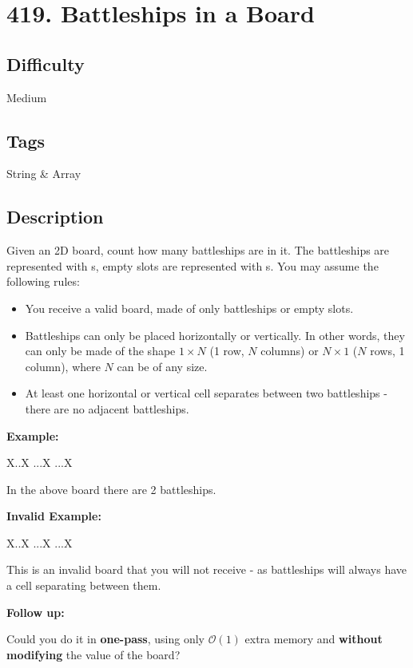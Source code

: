 \tocless\section{419. Battleships in a Board}
\label{algo:419}

\subsection*{Difficulty}
Medium

\subsection*{Tags}
String \& Array

\subsection*{Description}
Given an 2D board, count how many battleships are in it. The battleships are represented with s, empty slots are represented with s. You may assume the following rules:
\begin{itemize}
    \item You receive a valid board, made of only battleships or empty slots.
    \item Battleships can only be placed horizontally or vertically. In other words, they can only be made of the shape $1 \times N$ (1 row, $N$ columns) or $N \times 1$ ($N$ rows, 1 column), where $N$ can be of any size.
    \item At least one horizontal or vertical cell separates between two battleships - there are no adjacent battleships.
\end{itemize}

\textbf{Example:}
\begin{multilinecode}
X..X
...X
...X
\end{multilinecode}
In the above board there are 2 battleships.

\textbf{Invalid Example:}
\begin{multilinecode}
X..X
...X
...X
\end{multilinecode}
This is an invalid board that you will not receive - as battleships will always have a cell separating between them.

\textbf{Follow up:}

Could you do it in \textbf{one-pass}, using only $\mathcal{O}(1)$ extra memory and \textbf{without modifying} the value of the board?

